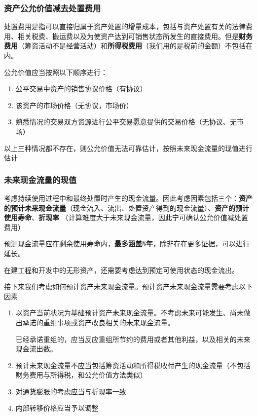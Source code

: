\documentclass[UTF8,12pt]{ctexart}
\numberwithin{equation}{section} %
\numberwithin{figure}{section}
\numberwithin{table}{section}
\begin{document}
	\subsubsection{资产公允价值减去处置费用}
	处置费用是指可以直接归属于资产处置的增量成本，包括与资产处置有关的法律费用、相关税费、搬运费以及为使资产达到可销售状态所发生的直接费用。但是\textbf{财务费用}（筹资活动不是经营活动）和\textbf{所得税费用}（我们用的是税前的金额）不包括在内。
	
	公允价值应当按照以下顺序进行：
	\begin{enumerate}
		\item 公平交易中资产的销售协议价格（有协议）
		
		\item 该资产的市场价格（无协议，市场价）
		
		\item 熟悉情况的交易双方资源进行公平交易愿意提供的交易价格（无协议、无市场）
	\end{enumerate}
	以上三种情况都不存在，则公允价值无法可靠估计，按照未来现金流量的现值进行估计
	
	\subsubsection{未来现金流量的现值}
	考虑持续使用过程中和最终处置时产生的现金流量。因此考虑因素包括三个：\textbf{资产的预计未来现金流量}（现金流入、流出、处置资产得到的现金流量）、\textbf{资产的预计使用寿命}、\textbf{折现率} （计算难度大于未来现金流量，因此宁可确认公允价值减处置费用）
	
	预测现金流量应在剩余使用寿命内，\textbf{最多涵盖5年}，除非存在更多证据，可以进行延长。
	
	在建工程和开发中的无形资产，还需要考虑达到预定可使用状态的现金流出。
	
	接下来我们考虑如何预计资产未来现金流量。预计资产未来现金流量需要考虑以下因素
	\begin{enumerate}
		\item 以资产当前状况为基础预计资产未来现金流量。不考虑未来可能发生、尚未做出承诺的重组事项或资产改良相关的未来现金流量。
		
		已经承诺重组的，应当反应重组所节约的费用或者其他利益，以及相关的未来现金流出数。
		
		\item 预计未来现金流量不应当包括筹资活动和所得税收付产生的现金流量（不包括财务费用与所得税，和公允价值方法类似）
		
		\item 对通货膨胀的考虑应当与折现率一致
		
		\item 内部转移价格应当予以调整
	\end{enumerate}
	
\end{document}
